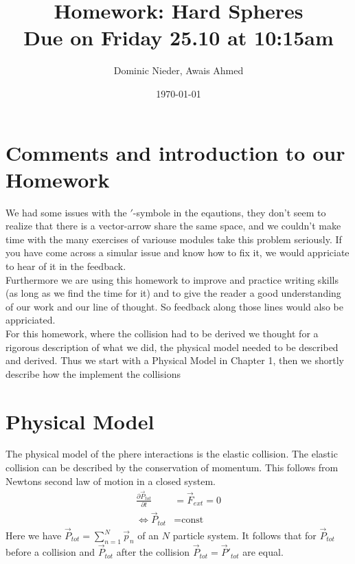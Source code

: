 \documentclass{article}
\title{
    \vspace{2in}
    \textmd{\textbf{Homework: Hard Spheres}}\\
    \normalsize\vspace{0.1in}\small{Due on Friday 25.10 at 10:15am}\\
    \vspace{0.1in}
    \vspace{3in}
}
\author{Dominic Nieder, Awais Ahmed}
\date{\today}
\begin{document}
\maketitle

\newpage

\section{Comments and introduction to our Homework}
We had some issues with the $\prime$-symbole in the eqautions, they don't seem to realize that there is a vector-arrow share the same space, and we couldn't make time with the many exercises of variouse modules take this problem seriously. If you have come across a simular issue and know how to fix it, we would appriciate to hear of it in the feedback. \\
Furthermore we are using this homework to improve and practice writing skills (as long as we find the time for it) and to give the reader a good understanding of our work and our line of thought. So feedback along those lines would also be appriciated.  \\

For this homework, where the collision had to be derived we thought for a rigorous description of what we did, the physical model needed to be described and derived. Thus we start with a Physical Model in Chapter 1, then we shortly describe how the implement the collisions 

\section{Physical Model}

    The physical model of the phere interactions is the elastic collision. The elastic collision can be described by the conservation of momentum. This follows from Newtons second law of motion in a closed system.
    \begin{align*}
        \frac{\partial \vec{P}_{tot}}{\partial t} &= \vec{F}_{ext}=0  \\
        \Leftrightarrow \vec{P}_{tot}&=\text{const} 
    \end{align*}
    Here we have $\vec{P}_{tot}=\sum_{n=1}^{N}\vec{p}_n$ of an $N$ particle system. It follows that for $\vec{P}_{tot}$ before a collision and $\vec{P}_{tot}$ after the collision $\vec{P}_{tot}=\vec{P}'_{tot}$ are equal. \\
\end{document}
